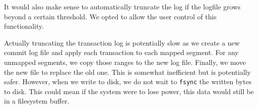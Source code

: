 \documentclass{report} %
\numberwithin{equation}{section} %
\numberwithin{figure}{section} %
\numberwithin{table}{section} %
\begin{document}
It would also make sense to automatically truncate the log if the logfile grows beyond a certain threshold. We opted to allow the user control of this functionality.

Actually truncating the transaction log is potentially slow as we create a new commit log file and apply each transaction to each mapped segment. For any unmapped segments, we copy those ranges to the new log file. Finally, we move the new file to replace the old one. This is somewhat inefficient but is potentially safer. However, when we write to disk, we do not wait to \texttt{fsync} the written bytes to disk. This could mean if the system were to lose power, this data would still be in a filesystem buffer.
\end{document}
